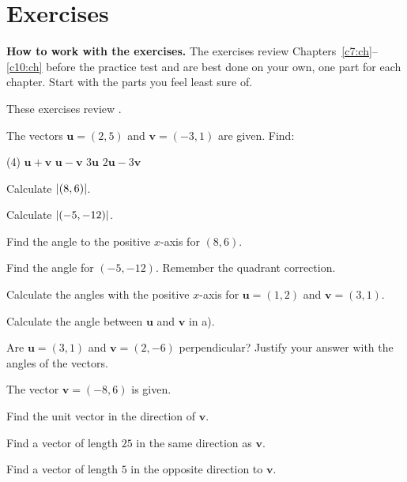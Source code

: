 
\section{Exercises}
\label{c11:sec:uppgifter}

\begin{aside}
\textbf{How to work with the exercises.} The exercises review Chapters~\ref{c7:ch}--\ref{c10:ch}
before the practice test and are best done on your own, one part for each chapter. Start with the
parts you feel least sure of.

\end{aside}

These exercises review .

The vectors $\mathbf{u} = (2, 5)$ and $\mathbf{v} = (-3, 1)$ are given. Find:
\begin{delar}(4)
  \task $\mathbf{u} + \mathbf{v}$
  \task $\mathbf{u} - \mathbf{v}$
  \task $3\mathbf{u}$
  \task $2\mathbf{u} - 3\mathbf{v}$
\end{delar}

\begin{parts}
  \item Calculate $\lvert(8, 6)\rvert$.
  \item Calculate $\lvert(-5, -12)\rvert$.
  \item Find the angle to the positive $x$-axis for $(8, 6)$.
  \item Find the angle for $(-5, -12)$. Remember the quadrant correction.
\end{parts}

\begin{parts}
  \item Calculate the angles with the positive $x$-axis for $\mathbf{u} = (1, 2)$ and
    $\mathbf{v} = (3, 1)$.
  \item Calculate the angle between $\mathbf{u}$ and $\mathbf{v}$ in a).
  \item Are $\mathbf{u} = (3, 1)$ and $\mathbf{v} = (2, -6)$ perpendicular? Justify your answer with
    the angles of the vectors.
\end{parts}

The vector $\mathbf{v} = (-8, 6)$ is given.
\begin{parts}
  \item Find the unit vector in the direction of $\mathbf{v}$.
  \item Find a vector of length $25$ in the same direction as $\mathbf{v}$.
  \item Find a vector of length $5$ in the opposite direction to $\mathbf{v}$.
\end{parts}

